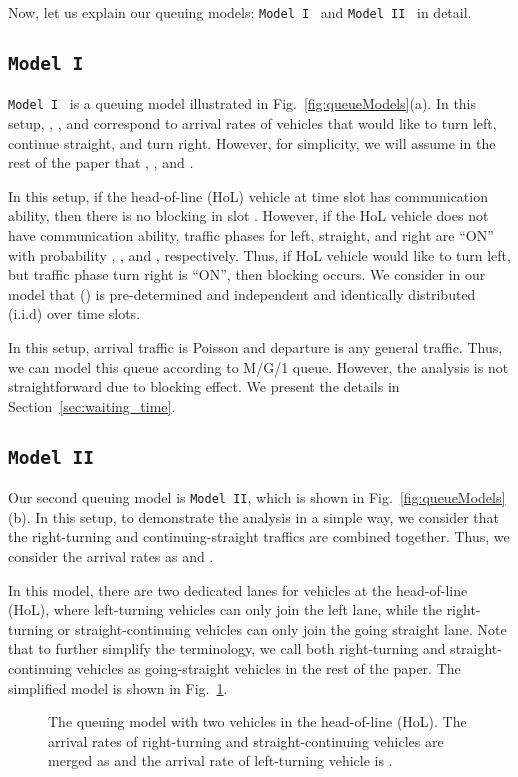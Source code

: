 \documentclass[conference]{IEEEtran}
\newcommand{\modelI}{{\tt{Model I}}}
\newcommand{\modelII}{{\tt{Model II}}}
\begin{document}
Now, let us explain our queuing models; \modelI~ and \modelII~ in detail.

\vspace{-5pt}
\subsection{\modelI}
\modelI~ is a queuing model illustrated in Fig.~\ref{fig:queueModels}(a). In this setup, , , and  correspond to arrival rates of vehicles that would like to turn left, continue straight, and turn right. However, for simplicity, we will assume in the rest of the paper that , , and .

In this setup, if the head-of-line (HoL) vehicle at time slot  has communication ability, then there is no blocking in slot . However, if the HoL vehicle does not have communication ability, traffic phases for left, straight, and right are ``ON'' with probability , , and , respectively. Thus, if HoL vehicle would like to turn left, but traffic phase turn right is ``ON'', then blocking occurs. We consider in our model that  () is pre-determined and independent and identically distributed (i.i.d) over time slots.

In this setup, arrival traffic is Poisson and departure is any general traffic. Thus, we can model this queue according to M/G/1 queue. However, the analysis is not straightforward due to blocking effect. We present the details in Section~\ref{sec:waiting_time}.

\vspace{-5pt}
\subsection{\modelII}
Our second queuing model is \modelII, which is shown in Fig.~\ref{fig:queueModels}(b). In this setup, to demonstrate the analysis in a simple way, we consider that the right-turning and continuing-straight traffics are combined together. Thus, we consider the arrival rates as  and .

In this model, there are two dedicated lanes for vehicles at the head-of-line (HoL), where left-turning vehicles can only join the left lane, while the right-turning or straight-continuing vehicles can only join the going straight lane. Note that to further simplify the terminology, we call both right-turning and straight-continuing vehicles as going-straight vehicles in the rest of the paper. The simplified model is shown in  Fig.~\ref{model2}.

\begin{figure} [t!]
\vspace{-10pt}
\centering
{}
\caption{\label{model2} The queuing model with two vehicles in the head-of-line (HoL). The arrival rates of right-turning and straight-continuing vehicles are merged as  and the arrival rate of left-turning vehicle is .}
\vspace{-15pt}
\end{figure}
\end{document}
